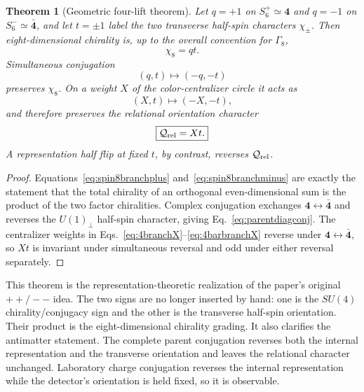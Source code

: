 \documentclass[11pt]{article}
\newtheorem{theorem}{Theorem}[section]
\theoremstyle{definition}\newtheorem{definition}[theorem]{Definition}
\theoremstyle{remark}\newtheorem{remark}[theorem]{Remark}\newtheorem{conjecture}[theorem]{Conjecture}
\begin{document}
\begin{theorem}[Geometric four-lift theorem]\label{thm:geometricfourlift}
Let $q=+1$ on $S_6^+\simeq\mathbf4$ and $q=-1$ on $S_6^-\simeq\bar{\mathbf4}$, and let $t=\pm1$ label the two transverse half-spin characters $\chi_\pm$. Then eight-dimensional chirality is, up to the overall convention for $\Gamma_8$,
\begin{equation}
 \boxed{\chi_8=qt.}
\end{equation}
Simultaneous conjugation
\begin{equation}\label{eq:parentdiagconj}
 (q,t)\longmapsto(-q,-t)
\end{equation}
preserves $\chi_8$. On a weight $X$ of the color-centralizer circle it acts as
\begin{equation}
 (X,t)\longmapsto(-X,-t),
\end{equation}
and therefore preserves the relational orientation character
\begin{equation}\label{eq:XetaInvariant}
 \boxed{\mathcal Q_{\rm rel}=Xt.}
\end{equation}
A representation half flip at fixed $t$, by contrast, reverses $\mathcal Q_{\rm rel}$.
\end{theorem}
\begin{proof}
Equations~\eqref{eq:spin8branchplus} and~\eqref{eq:spin8branchminus} are exactly the statement that the total chirality of an orthogonal even-dimensional sum is the product of the two factor chiralities. Complex conjugation exchanges $\mathbf4\leftrightarrow\bar{\mathbf4}$ and reverses the $U(1)_\perp$ half-spin character, giving Eq.~\eqref{eq:parentdiagconj}. The centralizer weights in Eqs.~\eqref{eq:4branchX}--\eqref{eq:4barbranchX} reverse under $\mathbf4\leftrightarrow\bar{\mathbf4}$, so $Xt$ is invariant under simultaneous reversal and odd under either reversal separately.
\end{proof}

This theorem is the representation-theoretic realization of the paper's original $++/--$ idea. The two signs are no longer inserted by hand: one is the $SU(4)$ chirality/conjugacy sign and the other is the transverse half-spin orientation. Their product is the eight-dimensional chirality grading. It also clarifies the antimatter statement. The complete parent conjugation reverses both the internal representation and the transverse orientation and leaves the relational character unchanged. Laboratory charge conjugation reverses the internal representation while the detector's orientation is held fixed, so it is observable.
\end{document}
